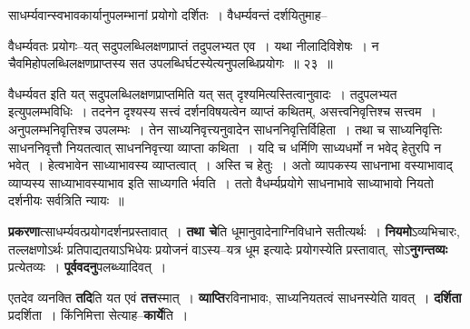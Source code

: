 \documentclass[article,12pt,a4paper]{memoir}
\begin{document}
	  \pstart साधर्म्यवान्स्वभावकार्यानुपलम्भानां प्रयोगो दर्शितः । वैधर्म्यवन्तं दर्शयितुमाह--
	\pend
        
	  \bigskip
	  \begingroup
	

	  \pstart वैधर्म्यवतः प्रयोगः--यत् सदुपलब्धिलक्षणप्राप्तं तदुपलभ्यत एव । यथा नीलादिविशेषः । न चैवमिहोपलब्धिलक्षणप्राप्तस्य सत उपलब्धिर्घटस्येत्यनुपलब्धिप्रयोगः ॥ २३ ॥
	\pend
      
	  \endgroup
	 

	  \pstart वैधर्म्यवत इति यत् सदुपलब्धिलक्षणप्राप्तमिति यत् सत् दृश्यमित्यस्तित्वानुवादः । तदुपलभ्यत इत्युपलम्भविधिः । तदनेन दृश्यस्य सत्त्वं दर्शनविषयत्वेन व्याप्तं कथितम्, असत्त्वनिवृत्तिश्च सत्त्वम । अनुपलम्भनिवृत्तिश्च उपलम्भः । तेन साध्यनिवृत्त्यनुवादेन साधननिवृत्तिर्विहिता । तथा च साध्यनिवृत्तिः साधननिवृत्तौ नियतत्वात् साधननिवृत्त्या व्याप्ता कथिता । यदि च धर्मिणि साध्यधर्मो न भवेद् हेतुरपि न भवेत् । हेत्वभावेन साध्याभावस्य व्याप्तत्वात् । अस्ति च हेतुः । अतो व्यापकस्य साधनाभा वस्याभावाद् व्याप्यस्य साध्याभावस्याभाव इति साध्यगति र्भवति । ततो वैधर्म्यप्रयोगे साधनाभावे साध्याभावो नियतो दर्शनीयः सर्वत्रिति न्यायः ॥
	\pend
      
	  \endgroup
	

	  \pstart \textbf{प्रकरणा}त्साधर्म्यवत्प्रयोगदर्शनप्रस्तावात् । \textbf{तथा चे}ति धूमानुवादेनाग्निविधाने सतीत्यर्थः । \textbf{नियमो}ऽव्यभिचारः, तल्लक्षणोऽर्थः प्रतिपाद्यतयाऽभिधेयः प्रयोजनं वाऽस्य--यत्र धूम इत्यादेः प्रयोगस्येति प्रस्तावात्, सोऽ\textbf{नुगन्तव्यः} प्रत्येतव्यः । \textbf{पूर्ववदनु}पलब्ध्यादिवत् ।
	\pend
      

	  \pstart एतदेव व्यनक्ति \textbf{तदि}ति यत एवं \textbf{तत्त}स्मात् । \textbf{व्याप्ति}रविनाभावः, साध्यनियतत्वं साधनस्येति यावत् । \textbf{दर्शिता} प्रदर्शिता । किंनिमित्ता सेत्याह--\textbf{कार्ये}ति ।
	\pend
      
\end{document}
